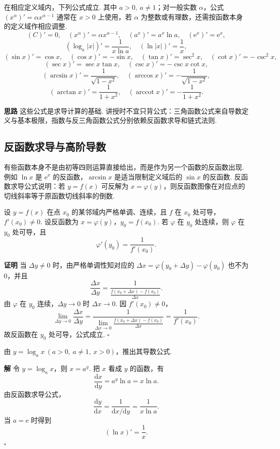 \documentclass[fontset=fandol]{ctexart}
\newenvironment{proofdetail}{\par\noindent\textbf{证明}\quad}{\hfill$\square$\par\vspace{0.8em}}
\newenvironment{solution}{\par\noindent\textbf{解}\quad}{\hfill$\square$\par\vspace{0.8em}}
\newenvironment{idea}{\par\noindent\textbf{思路}\quad}{\par\vspace{0.4em}}
\newcommand{\dd}{\mathrm{d}}
\newcommand{\ee}{\mathrm{e}}
\begin{document}
\begin{proposition}[常用基本导数公式]
在相应定义域内，下列公式成立. 其中 $a>0,\ a\neq1$；对一般实数 $\alpha$，公式 $(x^\alpha)'=\alpha x^{\alpha-1}$ 通常在 $x>0$ 上使用，若 $\alpha$ 为整数或有理数，还需按函数本身的定义域作相应调整.
\[
(C)'=0,\quad (x^\alpha)'=\alpha x^{\alpha-1},\quad (a^x)'=a^x\ln a,\quad (\ee^x)'=\ee^x,
\]
\[
(\log_a |x|)'=\frac1{x\ln a},\quad (\ln |x|)'=\frac1x,
\]
\[
(\sin x)'=\cos x,\quad (\cos x)'=-\sin x,\quad
(\tan x)'=\sec^2x,\quad (\cot x)'=-\csc^2x,
\]
\[
(\sec x)'=\sec x\tan x,\quad (\csc x)'=-\csc x\cot x,
\]
\[
(\arcsin x)'=\frac1{\sqrt{1-x^2}},\quad
(\arccos x)'=-\frac1{\sqrt{1-x^2}},
\]
\[
(\arctan x)'=\frac1{1+x^2},\quad
(\operatorname{arccot}x)'=-\frac1{1+x^2}.
\]
\end{proposition}
\begin{idea}
这些公式是求导计算的基础. 讲授时不宜只背公式：三角函数公式来自导数定义与基本极限，指数与反三角函数公式分别依赖反函数求导和链式法则.
\end{idea}

\subsection{反函数求导与高阶导数}

有些函数本身不是由初等四则运算直接给出，而是作为另一个函数的反函数出现. 例如 $\ln x$ 是 $\ee^x$ 的反函数，$\arcsin x$ 是适当限制定义域后的 $\sin x$ 的反函数. 反函数求导公式说明：若 $y=f(x)$ 可反解为 $x=\varphi(y)$，则反函数图像在对应点的切线斜率等于原函数切线斜率的倒数.

\begin{theorem}[反函数求导公式]
设 $y=f(x)$ 在点 $x_0$ 的某邻域内严格单调、连续，且 $f$ 在 $x_0$ 处可导，$f'(x_0)\neq0$. 设反函数为 $x=\varphi(y)$，$y_0=f(x_0)$. 若 $\varphi$ 在 $y_0$ 处连续，则 $\varphi$ 在 $y_0$ 处可导，且
\[
\varphi'(y_0)=\frac{1}{f'(x_0)}.
\]
\end{theorem}
\begin{proofdetail}
当 $\Delta y\neq0$ 时，由严格单调性知对应的 $\Delta x=\varphi(y_0+\Delta y)-\varphi(y_0)$ 也不为 $0$，并且
\[
\frac{\Delta x}{\Delta y}
=\frac{1}{\frac{f(x_0+\Delta x)-f(x_0)}{\Delta x}}.
\]
由 $\varphi$ 在 $y_0$ 连续，$\Delta y\to0$ 时 $\Delta x\to0$. 因 $f'(x_0)\neq0$，
\[
\lim_{\Delta y\to0}\frac{\Delta x}{\Delta y}
=\frac{1}{\lim_{\Delta x\to0}\frac{f(x_0+\Delta x)-f(x_0)}{\Delta x}}
=\frac1{f'(x_0)}.
\]
故反函数在 $y_0$ 处可导，公式成立.
\end{proofdetail}

\begin{example}[由反函数推出对数函数导数]
由 $y=\log_a x\ (a>0,\ a\neq1,\ x>0)$，推出其导数公式.
\end{example}
\begin{solution}
令 $y=\log_a x$，则 $x=a^y$. 把 $x$ 看成 $y$ 的函数，有
\[
\frac{\dd x}{\dd y}=a^y\ln a=x\ln a.
\]
由反函数求导公式，
\[
\frac{\dd y}{\dd x}
=\frac{1}{\dd x/\dd y}
=\frac{1}{x\ln a}.
\]
当 $a=\ee$ 时得到
\[
(\ln x)'=\frac1x.
\]
\end{solution}
\end{document}
